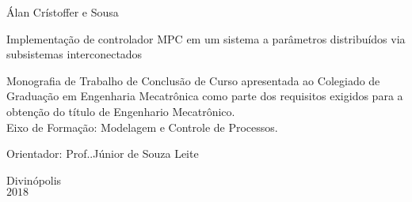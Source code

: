 \begin{center}
    \large Álan Crístoffer e Sousa
\end{center}

\vspace*{3.0cm}

\begin{center}
    {\textsc Implementação de controlador MPC em um sistema a parâmetros
        distribuídos via subsistemas interconectados}  %
\end{center}

\vspace*{1.5cm}

\begin{flushright}
    \begin{minipage}{9.0cm}
        Monografia de Trabalho de Conclusão de Curso apresentada ao
        Colegiado de Graduação em Engenharia Mecatrônica
        como  parte dos requisitos exigidos para a obtenção do título de
        Engenhario Mecatrônico.\\
        Eixo de Formação: Modelagem e Controle de Processos.

        \vspace*{1cm}

        Orientador: Prof.\@Dr.\@Valter Júnior de Souza Leite\\
    \end{minipage}
\end{flushright}

\vspace*{1.5cm}

\columnwidth{}
\centerline{} %

\null\vfill

\begin{center}
    Divinópolis\\
    \(2018\) %
\end{center}

\cleardoublepage{}


\cleardoublepage{}


\cleardoublepage{}
